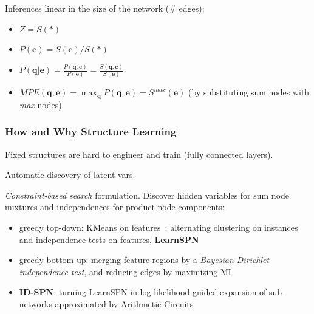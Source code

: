\documentclass[xcolor={usenames,dvipsnames,svgnames}, compress]{beamer}
\begin{document}
\begin{frame}
\begin{minipage}{0.62\linewidth}
    Inferences linear in the size of the network (\# edges):\\[-5pt]
    \begin{itemize}
    \item $Z = S(*)$
    \item $P(\mathbf{e}) = S(\mathbf{e})/S(*)$
    \item $P(\mathbf{q}| \mathbf{e}) = \frac{P(\mathbf{q},
        \mathbf{e})}{P(\mathbf{e})} = \frac{S(\mathbf{q},
        \mathbf{e})}{S(\mathbf{e})}$
    \item $MPE(\mathbf{q},\mathbf{e}) = \max_{\mathbf{q}}P(\mathbf{q},
      \mathbf{e}) = S^{max}(\mathbf{e})$  (by substituting sum nodes
      with \emph{max} nodes)
    \end{itemize}
     
    
    
  \end{minipage}
\end{frame}

\begin{frame}
  \frametitle{How and Why Structure Learning}
  \footnotesize
  Fixed structures are hard to engineer and train (fully connected layers).\par\bigskip
  
  Automatic discovery of latent vars.\par\bigskip

   \emph{Constraint-based search} formulation. Discover hidden variables for sum node mixtures and independences
  for product node components:
  \begin{itemize}
    \itemsep 6pt
  \item greedy top-down: KMeans on features~\emph{\parencite{Dennis2012}}; alternating clustering on
    instances and independence tests on features, \textbf{LearnSPN}~\emph{\parencite{Gens2013}}

  \item greedy bottom up: merging feature regions by a \emph{Bayesian-Dirichlet independence test},  and reducing edges by maximizing MI\emph{~\parencite{Peharz2013}}

  

  \item \textbf{ID-SPN}: turning LearnSPN in log-likelihood guided expansion of sub-networks
    approximated by Arithmetic Circuits~\emph{\parencite{Rooshenas2014-short}}

  \end{itemize}
  \vspace{6pt}

  
\end{frame}
\end{document}
